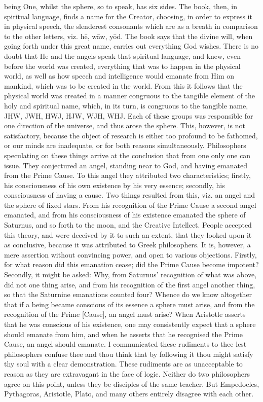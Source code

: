 \documentclass[12pt]{article}
\begin{document}
being One, whilst the sphere, so to speak, has six sides. The book, then, in spiritual language, finds a name for the Creator, choosing, in order to express it in physical speech, the slenderest consonants which are as a breath in comparison to the other letters, viz. hē, wāw, yōd. The book says that the divine will, when going forth under this great name, carries out everything God wishes. There is no doubt that He and the angels speak that spiritual language, and knew, even before the world was created, everything that was to happen in the physical world, as well as how speech and intelligence would emanate from Him on mankind, which was to be created in the world. From this it follows that the physical world was created in a manner congruous to the tangible element of the holy and spiritual name, which, in its turn, is congruous to the tangible name, JHW, JWH, HWJ, HJW, WJH, WHJ. Each of these groups was responsible for one direction of the universe, and thus arose the sphere. This, however, is not satisfactory, because the object of research is either too profound to be fathomed, or our minds are inadequate, or for both reasons simultaneously. Philosophers speculating on these things arrive at the conclusion that from one only one can issue. They conjectured an angel, standing near to God, and having emanated from the Prime Cause. To this angel they attributed two characteristics; firstly, his consciousness of his own existence by his very essence; secondly, his consciousness of having a cause. Two things resulted from this, viz. an angel and the sphere of fixed stars. From his recognition of the Prime Cause a second angel emanated, and from his consciousness of his existence emanated the sphere of Saturnus, and so forth to the moon, and the Creative Intellect. People accepted this theory, and were deceived by it to such an extent, that they looked upon it as conclusive, because it was attributed to Greek philosophers. It is, however, a mere assertion without convincing power, and open to various objections. Firstly, for what reason did this emanation cease; did the Prime Cause become impotent? Secondly, it might be asked: Why, from Saturnus' recognition of what was above, did not one thing arise, and from his recognition of the first angel another thing, so that the Saturnine emanations counted four? Whence do we know altogether that if a being became conscious of its essence a sphere must arise, and from the recognition of the Prime [Cause], an angel must arise? When Aristotle asserts that he was conscious of his existence, one may consistently expect that a sphere should emanate from him, and when he asserts that he recognised the Prime Cause, an angel should emanate. I communicated these rudiments to thee lest philosophers confuse thee and thou think that by following it thou might satisfy thy soul with a clear demonstration. These rudiments are as unacceptable to reason as they are extravagant in the face of logic. Neither do two philosophers agree on this point, unless they be disciples of the same teacher. But Empedocles, Pythagoras, Aristotle, Plato, and many others entirely disagree with each other.
\end{document}
